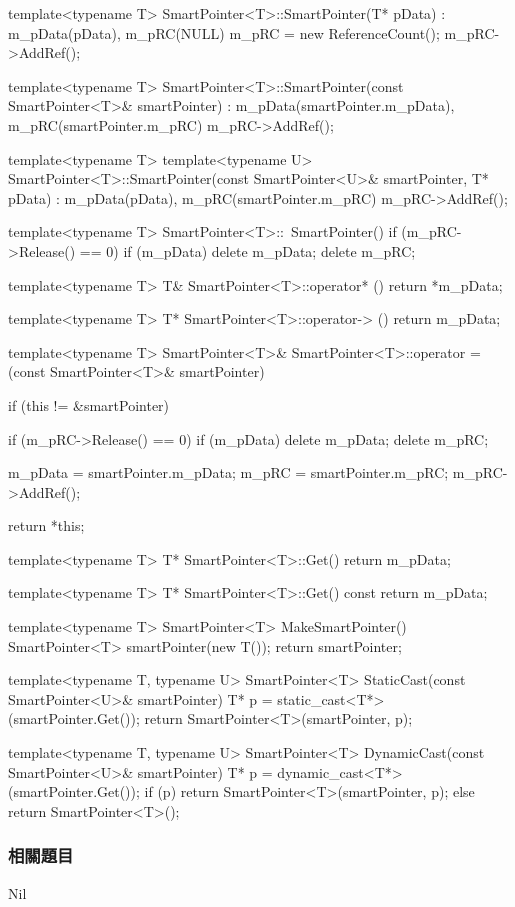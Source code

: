 \begin{Code}
template<typename T>
SmartPointer<T>::SmartPointer(T* pData)
    : m_pData(pData), m_pRC(NULL)
{
    m_pRC = new ReferenceCount();
    m_pRC->AddRef();
}

template<typename T>
SmartPointer<T>::SmartPointer(const SmartPointer<T>& smartPointer)
    : m_pData(smartPointer.m_pData), m_pRC(smartPointer.m_pRC)
{
    m_pRC->AddRef();
}

template<typename T>
template<typename U>
SmartPointer<T>::SmartPointer(const SmartPointer<U>& smartPointer, T* pData)
    : m_pData(pData), m_pRC(smartPointer.m_pRC)
{
    m_pRC->AddRef();
}

template<typename T>
SmartPointer<T>::~SmartPointer()
{
    if (m_pRC->Release() == 0)
    {
        if (m_pData)
            delete m_pData;
        delete m_pRC;
    }
}

template<typename T>
T& SmartPointer<T>::operator* ()
{
    return *m_pData;
}

template<typename T>
T* SmartPointer<T>::operator-> ()
{
    return m_pData;
}

template<typename T>
SmartPointer<T>& SmartPointer<T>::operator = (const SmartPointer<T>& smartPointer)
{
    if (this != &smartPointer)
    {
        if (m_pRC->Release() == 0)
        {
            if (m_pData)
                delete m_pData;
            delete m_pRC;
        }

        m_pData = smartPointer.m_pData;
        m_pRC = smartPointer.m_pRC;
        m_pRC->AddRef();
    }
    return *this;
}

template<typename T>
T* SmartPointer<T>::Get()
{
    return m_pData;
}

template<typename T>
T* SmartPointer<T>::Get() const
{
 return m_pData;
}

template<typename T>
SmartPointer<T> MakeSmartPointer()
{
    SmartPointer<T> smartPointer(new T());
    return smartPointer;
}

template<typename T, typename U>
SmartPointer<T> StaticCast(const SmartPointer<U>& smartPointer)
{
    T* p = static_cast<T*>(smartPointer.Get());
    return SmartPointer<T>(smartPointer, p);
}

template<typename T, typename U>
SmartPointer<T> DynamicCast(const SmartPointer<U>& smartPointer)
{
    T* p = dynamic_cast<T*>(smartPointer.Get());
    if (p)
        return SmartPointer<T>(smartPointer, p);
    else
        return SmartPointer<T>();
}
\end{Code}


\subsubsection{相關題目}
Nil